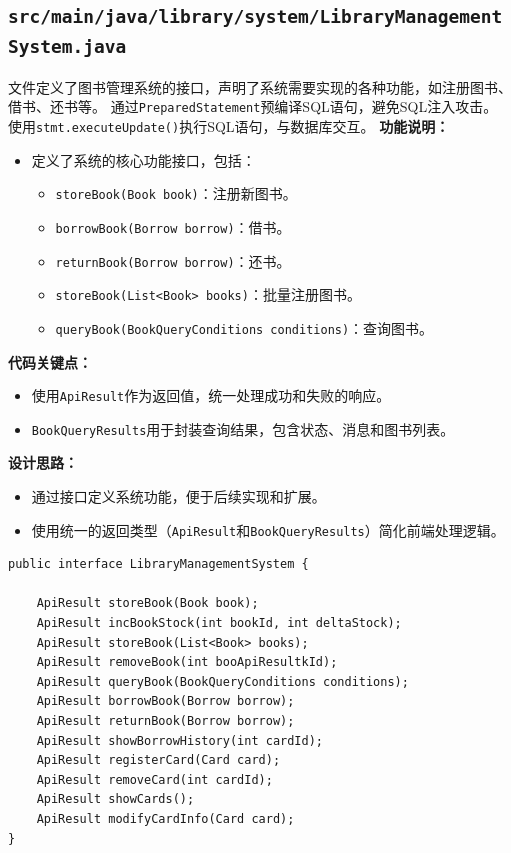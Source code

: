 \documentclass{ctexart}
\begin{document}
\subsection{\texttt{src/main/java/library/system/LibraryManagementSystem.java}}
文件定义了图书管理系统的接口，声明了系统需要实现的各种功能，如注册图书、借书、还书等。
通过\texttt{PreparedStatement}预编译SQL语句，避免SQL注入攻击。
使用\texttt{stmt.executeUpdate()}执行SQL语句，与数据库交互。
\textbf{功能说明：}
\begin{itemize}
    \item 定义了系统的核心功能接口，包括：
      \begin{itemize}
          \item \texttt{storeBook(Book book)}：注册新图书。
          \item \texttt{borrowBook(Borrow borrow)}：借书。
          \item \texttt{returnBook(Borrow borrow)}：还书。
          \item \texttt{storeBook(List<Book> books)}：批量注册图书。
          \item \texttt{queryBook(BookQueryConditions conditions)}：查询图书。
      \end{itemize}
\end{itemize}

\textbf{代码关键点：}
\begin{itemize}
    \item 使用\texttt{ApiResult}作为返回值，统一处理成功和失败的响应。
    \item \texttt{BookQueryResults}用于封装查询结果，包含状态、消息和图书列表。
\end{itemize}

\textbf{设计思路：}
\begin{itemize}
    \item 通过接口定义系统功能，便于后续实现和扩展。
    \item 使用统一的返回类型（\texttt{ApiResult}和\texttt{BookQueryResults}）简化前端处理逻辑。
\end{itemize}

\begin{lstlisting}[caption=\texttt{library.system/LibraryManagementSystem.java}]
public interface LibraryManagementSystem {

    ApiResult storeBook(Book book);
    ApiResult incBookStock(int bookId, int deltaStock);
    ApiResult storeBook(List<Book> books);
    ApiResult removeBook(int booApiResultkId);
    ApiResult queryBook(BookQueryConditions conditions);
    ApiResult borrowBook(Borrow borrow);
    ApiResult returnBook(Borrow borrow);
    ApiResult showBorrowHistory(int cardId);
    ApiResult registerCard(Card card);
    ApiResult removeCard(int cardId);
    ApiResult showCards();
    ApiResult modifyCardInfo(Card card);
}
\end{lstlisting}
\end{document}
